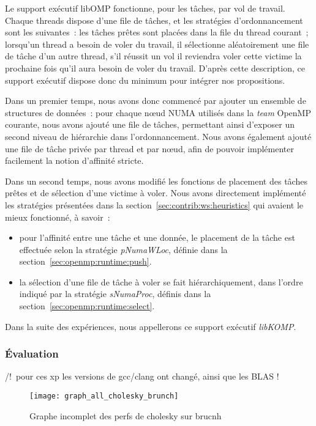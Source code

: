 Le support exécutif libOMP fonctionne, pour les tâches, par vol de travail.
Chaque threads dispose d'une file de tâches, et les stratégies d'ordonnancement sont les suivantes~: les tâches prêtes sont placées dans la file du thread courant~; lorsqu'un thread a besoin de voler du travail, il sélectionne aléatoirement une file de tâche d'un autre thread, s'il réussit un vol il reviendra voler cette victime la prochaine fois qu'il aura besoin de voler du travail.
D'après cette description, ce support exécutif dispose donc du minimum pour intégrer nos propositions.

Dans un premier temps, nous avons donc commencé par ajouter un ensemble de structures de données~: pour chaque nœud NUMA utilisés dans la \emph{team} OpenMP courante, nous avons ajouté une file de tâches, permettant ainsi d'exposer un second niveau de hiérarchie dans l'ordonnancement.
Nous avons également ajouté une file de tâche privée par thread et par nœud, afin de pouvoir implémenter facilement la notion d'affinité stricte.

Dans un second temps, nous avons modifié les fonctions de placement des tâches prêtes et de sélection d'une victime à voler.
Nous avons directement implémenté les stratégies présentées dans la section~\ref{sec:contrib:ws:heuristics} qui avaient le mieux fonctionné, à savoir~:
\begin{itemize}
  \item pour l'affinité entre une tâche et une donnée, le placement de la tâche est effectuée selon la stratégie \emph{pNumaWLoc}, définie dans la section~\ref{sec:openmp:runtime:push}.
  \item la sélection d'une file de tâche à voler se fait hiérarchiquement, dans l'ordre indiqué par la stratégie \emph{sNumaProc}, définis dans la section~\ref{sec:openmp:runtime:select}.
\end{itemize}

Dans la suite des expériences, nous appellerons ce support exécutif \emph{libKOMP}.

\subsubsection{Évaluation}

/!\ pour ces xp les versions de gcc/clang ont changé, ainsi que les BLAS !

\begin{figure}[ht]
  \centering
  \texttt{[image: graph\_all\_cholesky\_brunch]}
  \caption{Graphe incomplet des perfs de cholesky sur brucnh}\label{fig:contribs:perf_eval:eval-cholesky-brunch}
\end{figure}

